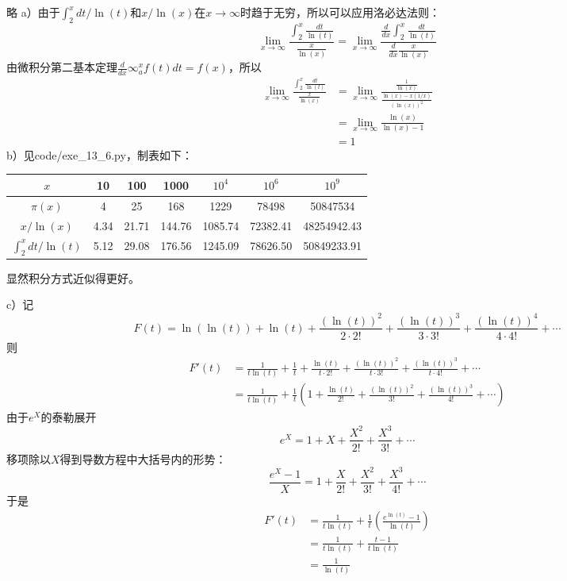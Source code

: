 %
\exercise 略
%
\exercise a）由于$\int_2^xdt/\ln(t)$和$x/\ln(x)$在$x\rightarrow \infty$时趋于无穷，所以可以应用洛必达法则：
\[\lim_{x\rightarrow\infty}\frac{\int_2^x\frac{dt}{\ln(t)}}{\frac{x}{\ln(x)}}=\lim_{x\rightarrow\infty}\frac{\frac{d}{dx}\int_2^x\frac{dt}{\ln(t)}}{\frac{d}{dx}\frac{x}{\ln(x)}}\]
由微积分第二基本定理$\frac{d}{dx}\infty_a^x f(t)dt=f(x)$，所以
\begin{align*}
\lim_{x\rightarrow\infty}\frac{\int_2^x\frac{dt}{\ln(t)}}{\frac{x}{\ln(x)}}&=\lim_{x\rightarrow\infty}\frac{\frac{1}{\ln(x)}}{\frac{\ln(x)-x(1/x)}{(\ln(x))^2}} \\
&=\lim_{x\rightarrow\infty}\frac{\ln(x)}{\ln(x)-1} \\
&=1
\end{align*}
b）见code/exe\_13\_6.py，制表如下：
\begin{center}
\begin{tabular}{|c||*{6}{c|}}
\hline
$x$ & 10 & 100 & 1000 & $10^4$ & $10^6$ & $10^9$ \\
\hline
$\pi(x)$ & 4 & 25 & 168 & 1229 & 78498 & 50847534 \\
\hline
$x/\ln(x)$ & 4.34 & 21.71 & 144.76 & 1085.74 & 72382.41 & 48254942.43 \\
\hline
$\int_2^x dt/\ln(t)$ & 5.12 & 29.08 & 176.56 & 1245.09 & 78626.50 & 50849233.91 \\
\hline
\end{tabular}
\end{center}
显然积分方式近似得更好。\par
c）记
\[F(t)=\ln(\ln (t))+\ln(t)+\frac{(\ln(t))^2}{2\cdot2!}+\frac{(\ln(t))^3}{3\cdot3!}+\frac{(\ln(t))^4}{4\cdot4!}+\cdots\]
则
\begin{align*}
F'(t)&=\frac{1}{t\ln(t)}+\frac{1}{t}+\frac{\ln(t)}{t\cdot2!}+\frac{(\ln(t))^2}{t\cdot3!}+\frac{(\ln(t))^3}{t\cdot4!}+\cdots \\
&=\frac{1}{t\ln(t)}+\frac{1}{t}\left(1+\frac{\ln(t)}{2!}+\frac{(\ln(t))^2}{3!}+\frac{(\ln(t))^3}{4!}+\cdots\right)
\end{align*}
由于$e^X$的泰勒展开
\[e^X=1+X+\frac{X^2}{2!}+\frac{X^3}{3!}+\cdots\]
移项除以$X$得到导数方程中大括号内的形势：
\[\frac{e^X-1}{X}=1+\frac{X}{2!}+\frac{X^2}{3!}+\frac{X^3}{4!}+\cdots\]
于是
\begin{align*}
F'(t)&=\frac{1}{t\ln(t)}+\frac{1}{t}\left(\frac{e^{\ln(t)}-1}{\ln(t)}\right) \\
&=\frac{1}{t\ln(t)}+\frac{t-1}{t\ln(t)} \\
&=\frac{1}{\ln(t)} \\
\end{align*}
